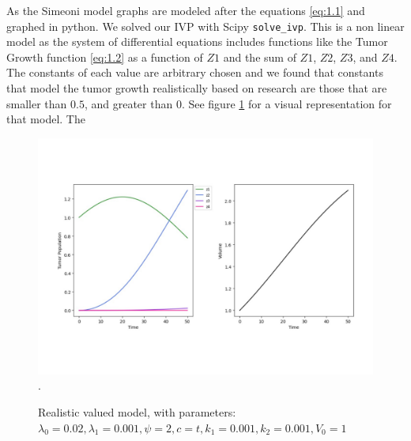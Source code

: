 \documentclass[11pt]{amsart}
\begin{document}
As the Simeoni model graphs are modeled after the equations \ref{eq:1.1} and graphed in python. We solved our IVP with Scipy \verb!solve_ivp!. This is a non linear model as the system of differential equations includes functions like the Tumor Growth function \ref{eq:1.2} as a function of $Z1$ and the sum of $Z1$, $Z2$, $Z3$, and $Z4$. The constants of each value are arbitrary chosen and we found that constants that model the tumor growth realistically based on research \cite{Koziol_Falls_Schnitzer_2020} are those that are smaller than $0.5$, and greater than $0$. See figure \ref{fig:2} for a visual representation for that model. The  
\begin{figure}[h]
\begin{center} %
\includegraphics[width=\textwidth]{parameters_like_paper.pdf}. %
\end{center}
\caption{Realistic valued model, with parameters: $\lambda_0=0.02, \lambda_1=0.001, \psi=2, c=t, k_1=0.001, k_2=0.001, V_0=1$}
\label{fig:2}
\end{figure}
\end{document}
